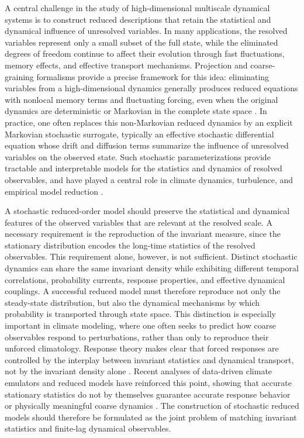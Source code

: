 \documentclass[11pt,twoside,fleqn]{article}
\begin{document}
A central challenge in the study of high-dimensional multiscale dynamical systems is to construct reduced descriptions that retain the statistical and dynamical influence of unresolved variables. In many applications, the resolved variables represent only a small subset of the full state, while the eliminated degrees of freedom continue to affect their evolution through fast fluctuations, memory effects, and effective transport mechanisms. Projection and coarse-graining formalisms provide a precise framework for this idea: eliminating variables from a high-dimensional dynamics generally produces reduced equations with nonlocal memory terms and fluctuating forcing, even when the original dynamics are deterministic or Markovian in the complete state space \cite{Zwanzig1961,Mori1965,ChorinHaldKupferman2000,GivonKupfermanStuart2004,WoutersLucarini2012,WoutersLucarini2013,pavliotis2008multiscale,MTV1,MTV2}. In practice, one often replaces this non-Markovian reduced dynamics by an explicit Markovian stochastic surrogate, typically an effective stochastic differential equation whose drift and diffusion terms summarize the influence of unresolved variables on the observed state. Such stochastic parameterizations provide tractable and interpretable models for the statistics and dynamics of resolved observables, and have played a central role in climate dynamics, turbulence, and empirical model reduction \cite{Hasselmann1976,Penland1989,PenlandSardeshmukh1995,KONDRASHOV201533,ChekrounSimonnetGhil2011,LucariniChekroun2023}.

A stochastic reduced-order model should preserve the statistical and dynamical features of the observed variables that are relevant at the resolved scale. A necessary requirement is the reproduction of the invariant measure, since the stationary distribution encodes the long-time statistics of the resolved observables. This requirement alone, however, is not sufficient. Distinct stochastic dynamics can share the same invariant density while exhibiting different temporal correlations, probability currents, response properties, and effective dynamical couplings. A successful reduced model must therefore reproduce not only the steady-state distribution, but also the dynamical mechanisms by which probability is transported through state space. This distinction is especially important in climate modeling, where one often seeks to predict how coarse observables respond to perturbations, rather than only to reproduce their unforced climatology. Response theory makes clear that forced responses are controlled by the interplay between invariant statistics and dynamical transport, not by the invariant density alone \cite{Ruelle1998,Ruelle2009}. Recent analyses of data-driven climate emulators and reduced models have reinforced this point, showing that accurate stationary statistics do not by themselves guarantee accurate response behavior or physically meaningful coarse dynamics \cite{falasca2025probing,falasca2024data,falasca2026causalrom,lucarini2026koopmanism}. The construction of stochastic reduced models should therefore be formulated as the joint problem of matching invariant statistics and finite-lag dynamical observables.
\end{document}
